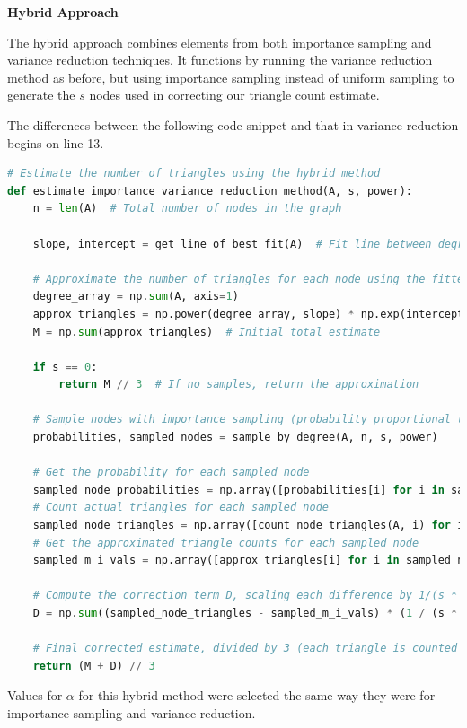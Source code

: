 \documentclass[11pt, margin=1in]{article}
\begin{document}
\textbf{Hybrid Approach}

The hybrid approach combines elements from both importance sampling and variance reduction techniques.
It functions by running the variance reduction method as before, but using importance sampling instead of uniform sampling to generate the $s$ nodes used in correcting our triangle count estimate.

The differences between the following code snippet and that in variance reduction begins on line 13.

{
\singlespacing
\begin{lstlisting}[language=Python]
# Estimate the number of triangles using the hybrid method
def estimate_importance_variance_reduction_method(A, s, power):
    n = len(A)  # Total number of nodes in the graph

    slope, intercept = get_line_of_best_fit(A)  # Fit line between degree and triangle count

    # Approximate the number of triangles for each node using the fitted line
    degree_array = np.sum(A, axis=1)
    approx_triangles = np.power(degree_array, slope) * np.exp(intercept)
    M = np.sum(approx_triangles)  # Initial total estimate

    if s == 0:
        return M // 3  # If no samples, return the approximation

    # Sample nodes with importance sampling (probability proportional to degree^power)
    probabilities, sampled_nodes = sample_by_degree(A, n, s, power)

    # Get the probability for each sampled node
    sampled_node_probabilities = np.array([probabilities[i] for i in sampled_nodes])
    # Count actual triangles for each sampled node
    sampled_node_triangles = np.array([count_node_triangles(A, i) for i in sampled_nodes])
    # Get the approximated triangle counts for each sampled node
    sampled_m_i_vals = np.array([approx_triangles[i] for i in sampled_nodes])

    # Compute the correction term D, scaling each difference by 1/(s * probability)
    D = np.sum((sampled_node_triangles - sampled_m_i_vals) * (1 / (s * sampled_node_probabilities)))

    # Final corrected estimate, divided by 3 (each triangle is counted 3 times)
    return (M + D) // 3
\end{lstlisting}
}

Values for $\alpha$ for this hybrid method were selected the same way they were for importance sampling and variance reduction.
\end{document}
